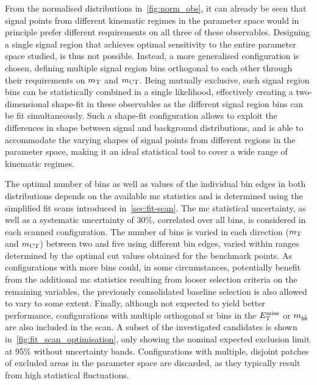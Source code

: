 From the normalised distributions in~\cref{fig:norm_obs}, it can already be seen that signal points from different kinematic regimes in the parameter space would in principle prefer different requirements on all three of these observables.
Designing a single signal region that achieves optimal sensitivity to the entire parameter space studied, is thus not possible.
Instead, a more generalised configuration is chosen, defining multiple signal region bins orthogonal to each other through their requirements on $m_{\textrm{T}}$ and $m_{\textrm{CT}}$.
Being mutually exclusive, such signal region bins can be statistically combined in a single likelihood, effectively creating a two-dimensional shape-fit in these observables as the different signal region bins can be fit simultaneously.
Such a shape-fit configuration allows to exploit the differences in shape between signal and background distributions, and is able to accommodate the varying shapes of signal points from different regions in the parameter space, making it an ideal statistical tool to cover a wide range of kinematic regimes.

The optimal number of bins as well as values of the individual bin edges in both distributions depends on the available \gls{mc} statistics and is determined using the simplified fit scans introduced in~\cref{sec:fit-scan}.
The \gls{mc} statistical uncertainty, as well as a systematic uncertainty of 30\%, correlated over all bins, is considered in each scanned configuration.
The number of bins is varied in each direction ($m_{\textrm{T}}$ and $m_{\textrm{CT}}$) between two and five using different bin edges, varied within ranges determined by the optimal cut values obtained for the benchmark points.
As configurations with more bins could, in some circumstances, potentially benefit from the additional \gls{mc} statistics resulting from looser selection criteria on the remaining variables, the previously consolidated baseline selection is also allowed to vary to some extent.
Finally, although not expected to yield better performance, configurations with multiple orthogonal \gls{sr} bins in the $E_{\textrm{T}}^{\textrm{miss}}$ or $m_{b\bar{b}}$ are also included in the scan.
A subset of the investigated candidates is shown in~\cref{fig:fit_scan_optimisation}, only showing the nominal expected exclusion limit at 95\% without uncertainty bands.
Configurations with multiple, disjoint patches of excluded areas in the parameter space are discarded, as they typically result from high statistical fluctuations.

